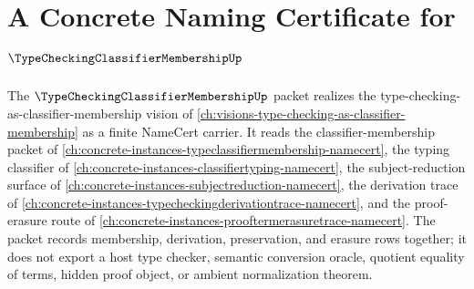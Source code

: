 \chapter{A Concrete Naming Certificate for $\TypeCheckingClassifierMembershipUp$}
\label{ch:concrete-instances-type-checking-classifier-membership-namecert}

The $\TypeCheckingClassifierMembershipUp$ packet realizes the type-checking-as-classifier-membership vision of \autoref{ch:visions-type-checking-as-classifier-membership} as a finite NameCert carrier. It reads the classifier-membership packet of \autoref{ch:concrete-instances-typeclassifiermembership-namecert}, the typing classifier of \autoref{ch:concrete-instances-classifiertyping-namecert}, the subject-reduction surface of \autoref{ch:concrete-instances-subjectreduction-namecert}, the derivation trace of \autoref{ch:concrete-instances-typecheckingderivationtrace-namecert}, and the proof-erasure route of \autoref{ch:concrete-instances-prooftermerasuretrace-namecert}. The packet records membership, derivation, preservation, and erasure rows together; it does not export a host type checker, semantic conversion oracle, quotient equality of terms, hidden proof object, or ambient normalization theorem.

